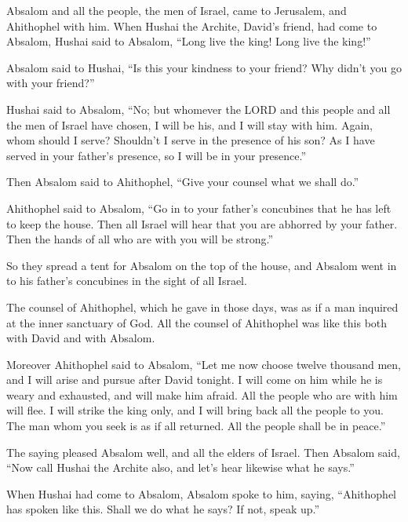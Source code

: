 \myverse{}Absalom and all the people, the men of Israel, came to Jerusalem,
and Ahithophel with him.
\myverse{}When Hushai the Archite, David’s friend, had come to Absalom, Hushai said
to Absalom, “Long live the king! Long live the king!”

\myverse{}Absalom said to Hushai, “Is this your kindness to your friend?
Why didn’t you go with your friend?”

\myverse{}Hushai said to Absalom, “No; but whomever the LORD and this
people and all the men of Israel have chosen, I will be his, and I will stay with him.
\myverse{}Again, whom should I serve? Shouldn’t I serve in the presence of his son?
As I have served in your father’s presence, so I will be in your presence.”

\myverse{}Then Absalom said to Ahithophel, “Give your counsel what we
shall do.”

\myverse{}Ahithophel said to Absalom, “Go in to your father’s concubines
that he has left to keep the house. Then all Israel will hear that you are abhorred by your father. Then
the hands of all who are with you will be strong.”

\myverse{}So they spread a tent for Absalom on the top of the house, and
Absalom went in to his father’s concubines in the sight of all Israel.

\myverse{}The counsel of Ahithophel, which he gave in those days, was
as if a man inquired at the inner sanctuary of God. All the counsel of Ahithophel was like this both with
David and with Absalom.


\mychapter{} \myverse*{}Moreover Ahithophel said to Absalom, “Let me now choose twelve
thousand men, and I will arise and pursue after David tonight.
\myverse{}I will come on him while he is weary and exhausted, and will make him afraid.
All the people who are with him will flee. I will strike the king only,
\myverse{}and I will bring back all the people to you. The man whom you seek is as if
all returned. All the people shall be in peace.”

\myverse{}The saying pleased Absalom well, and all the elders of Israel.
\myverse{}Then Absalom said, “Now call Hushai the Archite also, and let’s hear likewise
what he says.”

\myverse{}When Hushai had come to Absalom, Absalom spoke to him, saying,
“Ahithophel has spoken like this. Shall we do what he says? If not, speak up.”

